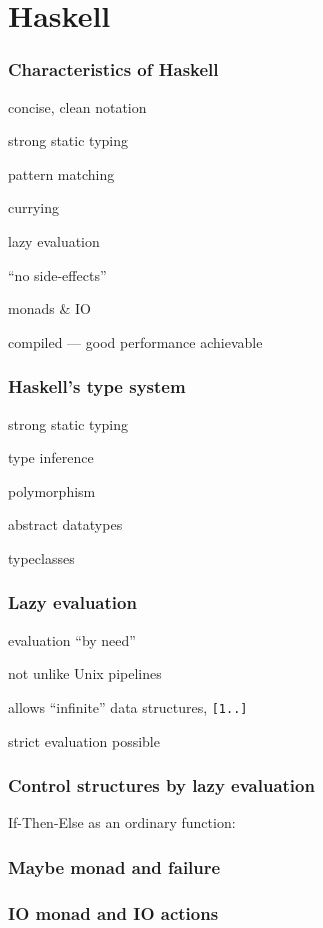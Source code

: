\section{Haskell}

\begin{frame}
\frametitle{Characteristics of Haskell}
\bi
\item concise, clean notation
\item strong static typing
\item pattern matching
\item currying
\item lazy evaluation
\item ``no side-effects''
\item monads \& IO
\item compiled --- good performance achievable
\ei
\end{frame}

\begin{frame}
\frametitle{Haskell's type system}
\bi
\item strong static typing
\item type inference
\item polymorphism
\item abstract datatypes
\item typeclasses
\ei
\end{frame}

\begin{frame}
\frametitle{Lazy evaluation}
\bi
\item evaluation ``by need''
\item not unlike Unix pipelines
\item allows ``infinite'' data structures, \texttt{[1..]}
\item strict evaluation possible
\ei
\end{frame}

\begin{frame}
\frametitle{Control structures by lazy evaluation}
If-Then-Else as an ordinary function:

\end{frame}

\begin{frame}
\frametitle{Maybe monad and failure}

\end{frame}

\begin{frame}
\frametitle{IO monad and IO actions}

\end{frame}

